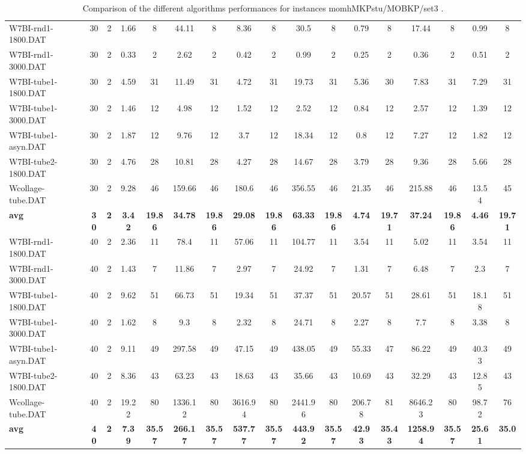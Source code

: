 \begin{table}[!ht]
{\begin{tabular}{lcccccccccccccccc}
W7BI-rnd1-1800.DAT & 30 & 2 & 1.66 & 8 & 44.11 & 8 & 8.36 & 8 & 30.5 & 8 & 0.79 & 8 & 17.44 & 8 & 0.99 & 8 \\
W7BI-rnd1-3000.DAT & 30 & 2 & 0.33 & 2 & 2.62 & 2 & 0.42 & 2 & 0.99 & 2 & 0.25 & 2 & 0.36 & 2 & 0.51 & 2 \\
W7BI-tube1-1800.DAT & 30 & 2 & 4.59 & 31 & 11.49 & 31 & 4.72 & 31 & 19.73 & 31 & 5.36 & 30 & 7.83 & 31 & 7.29 & 31 \\
W7BI-tube1-3000.DAT & 30 & 2 & 1.46 & 12 & 4.98 & 12 & 1.52 & 12 & 2.52 & 12 & 0.84 & 12 & 2.57 & 12 & 1.39 & 12 \\
W7BI-tube1-asyn.DAT & 30 & 2 & 1.87 & 12 & 9.76 & 12 & 3.7 & 12 & 18.34 & 12 & 0.8 & 12 & 7.27 & 12 & 1.82 & 12 \\
W7BI-tube2-1800.DAT & 30 & 2 & 4.76 & 28 & 10.81 & 28 & 4.27 & 28 & 14.67 & 28 & 3.79 & 28 & 9.36 & 28 & 5.66 & 28 \\
Wcollage-tube.DAT & 30 & 2 & 9.28 & 46 & 159.66 & 46 & 180.6 & 46 & 356.55 & 46 & 21.35 & 46 & 215.88 & 46 & 13.54 & 45 \\
\cline{1-17} \textbf{avg} & \textbf{30} & \textbf{2} & \textbf{3.42} & \textbf{19.86} & \textbf{34.78} & \textbf{19.86} & \textbf{29.08} & \textbf{19.86} & \textbf{63.33} & \textbf{19.86} & \textbf{4.74} & \textbf{19.71} & \textbf{37.24} & \textbf{19.86} & \textbf{4.46} & \textbf{19.71} \\ \cline{1-17}
W7BI-rnd1-1800.DAT & 40 & 2 & 2.36 & 11 & 78.4 & 11 & 57.06 & 11 & 104.77 & 11 & 3.54 & 11 & 5.02 & 11 & 3.54 & 11 \\
W7BI-rnd1-3000.DAT & 40 & 2 & 1.43 & 7 & 11.86 & 7 & 2.97 & 7 & 24.92 & 7 & 1.31 & 7 & 6.48 & 7 & 2.3 & 7 \\
W7BI-tube1-1800.DAT & 40 & 2 & 9.62 & 51 & 66.73 & 51 & 19.34 & 51 & 37.37 & 51 & 20.57 & 51 & 28.61 & 51 & 18.18 & 51 \\
W7BI-tube1-3000.DAT & 40 & 2 & 1.62 & 8 & 9.3 & 8 & 2.32 & 8 & 24.71 & 8 & 2.27 & 8 & 7.7 & 8 & 3.38 & 8 \\
W7BI-tube1-asyn.DAT & 40 & 2 & 9.11 & 49 & 297.58 & 49 & 47.15 & 49 & 438.05 & 49 & 55.33 & 47 & 86.22 & 49 & 40.33 & 49 \\
W7BI-tube2-1800.DAT & 40 & 2 & 8.36 & 43 & 63.23 & 43 & 18.63 & 43 & 35.66 & 43 & 10.69 & 43 & 32.29 & 43 & 12.85 & 43 \\
Wcollage-tube.DAT & 40 & 2 & 19.22 & 80 & 1336.12 & 80 & 3616.94 & 80 & 2441.96 & 80 & 206.78 & 81 & 8646.23 & 80 & 98.72 & 76 \\
\cline{1-17} \textbf{avg} & \textbf{40} & \textbf{2} & \textbf{7.39} & \textbf{35.57} & \textbf{266.17} & \textbf{35.57} & \textbf{537.77} & \textbf{35.57} & \textbf{443.92} & \textbf{35.57} & \textbf{42.93} & \textbf{35.43} & \textbf{1258.94} & \textbf{35.57} & \textbf{25.61} & \textbf{35.0} \\ \cline{1-17}
\bottomrule
\end{tabular}
}%
\caption{Comparison of the different algorithms performances for instances momhMKPstu/MOBKP/set3 .}
\label{tab:table_compare_momhMKPstu/MOBKP/set3 }
\end{table}
